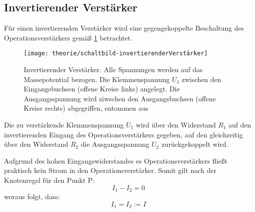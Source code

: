 \subsection{Invertierender Verstärker}
Für einen invertierenden Verstärker wird eine gegengekoppelte Beschaltung des
Operationsverstärkers gemäß \cref{fig:Theorie/invertierenderVerstärker} 
betrachtet.

\begin{figure}[H]
	\centering
	\texttt{[image: theorie/schaltbild-invertierenderVerstärker]}
	\caption{Invertierender Verstärker. Alle Spannungen werden auf das 
	Massepotential bezogen. Die Klemmenspannung $U_1$ zwischen den 
	Eingangsbuchsen (offene Kreise links) angelegt. Die Ausgangsspannung wird
	ziwschen den Ausgangsbuchsen (offene Kreise rechts) abgegriffen, entommen
	aus \cite{script}}
	\label{fig:Theorie/invertierenderVerstärker}
\end{figure}

Die zu verstärkende Klemmenspannung $U_1$ wird über den Widerstand $R_1$ auf den
invertierenden Eingang des Operationsverstärkers gegeben, auf den gleichzeitig
über den Widerstand $R_2$ die Ausgangsspannung $U_2$ zurückgekoppelt wird.

Aufgrund des hohen Eingangswiderstandes es Operationsverstärkers fließt
praktisch kein Strom in den Operationsverstärker. Somit gilt nach der 
Knotenregel für den Punkt P:
\begin{equation}
	I_1 - I_2 = 0
\end{equation}
woraus folgt, dass:
\begin{equation}
	I_1 = I_2 := I
\end{equation}
